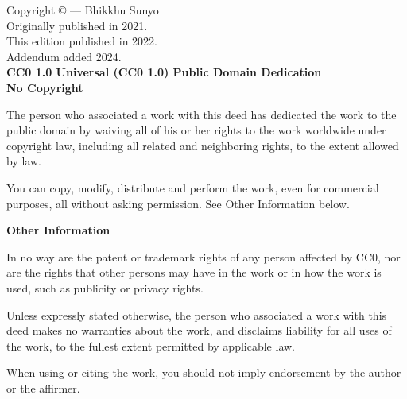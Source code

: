 \documentclass[10pt, openright]{book}
\begin{document}
\newpage
\begin{small}
\begin{sffamily}
\noindent Copyright © — Bhikkhu Sunyo\\

\noindent Originally published in 2021.\\\noindent This edition published in 2022.\\\noindent Addendum added 2024.\\

\noindent\textbf{CC0 1.0 Universal (CC0 1.0) Public Domain Dedication}\\



\noindent\textbf{No Copyright}

\noindent The person who associated a work with this deed has dedicated the work to the public domain by waiving all of his or her rights to the work worldwide under copyright law, including all related and neighboring rights, to the extent allowed by law.

\noindent You can copy, modify, distribute and perform the work, even for commercial purposes, all without asking permission. See Other Information below.


\noindent\textbf{Other Information}

\noindent In no way are the patent or trademark rights of any person affected by CC0, nor are the rights that other persons may have in the work or in how the work is used, such as publicity or privacy rights.

\noindent Unless expressly stated otherwise, the person who associated a work with this deed makes no warranties about the work, and disclaims liability for all uses of the work, to the fullest extent permitted by applicable law.

\noindent When using or citing the work, you should not imply endorsement by the author or the affirmer.

\end{sffamily}
\end{small}


\tableofcontents

\mainmatter
\pagestyle{fancy}

			
			
			
\end{document}
